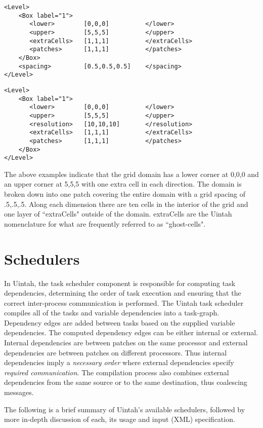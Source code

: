 \begin{Verbatim}[fontsize=\footnotesize]
<Level>
    <Box label="1">
       <lower>        [0,0,0]          </lower>
       <upper>        [5,5,5]          </upper>
       <extraCells>   [1,1,1]          </extraCells>
       <patches>      [1,1,1]          </patches>
    </Box>
    <spacing>         [0.5,0.5,0.5]    </spacing>
</Level>
\end{Verbatim}

\begin{Verbatim}[fontsize=\footnotesize]
<Level>
    <Box label="1">
       <lower>        [0,0,0]          </lower>
       <upper>        [5,5,5]          </upper>
       <resolution>   [10,10,10]       </resolution>
       <extraCells>   [1,1,1]          </extraCells>
       <patches>      [1,1,1]          </patches>
    </Box>
</Level>
\end{Verbatim}


The above examples indicate that the grid domain has a lower corner at
0,0,0 and an upper corner at 5,5,5 with one extra cell in each
direction.  The domain is broken down into one patch covering the
entire domain with a grid spacing of .5,.5,.5.  Along each dimension
there are ten cells in the interior of the grid and one layer of
``extraCells" outside of the domain.  extraCells are the Uintah nomenclature
for what are frequently referred to as ``ghost-cells".


\section{Schedulers} \label{Sec:Schedulers}

In Uintah, the task scheduler component is responsible for computing task
dependencies, determining the order of task execution and ensuring that the
correct inter-process communication is performed. The Uintah task scheduler
compiles all of the tasks and variable dependencies into a task-graph.
Dependency edges are added between tasks based on the supplied variable
dependencies. The computed dependency edges can be either internal or
external. Internal dependencies are between patches on the same processor and
external dependencies are between patches on different processors. Thus
internal dependencies imply a \emph{necessary order} where external
dependencies specify \emph{required communication}. The compilation process
also combines external dependencies from the same source or to the same
destination, thus coalescing messages.

\vspace{10pt}
\noindent The following is a brief summary of Uintah's available schedulers,
followed by more in-depth discussion of each, its usage and input (XML)
specification.

